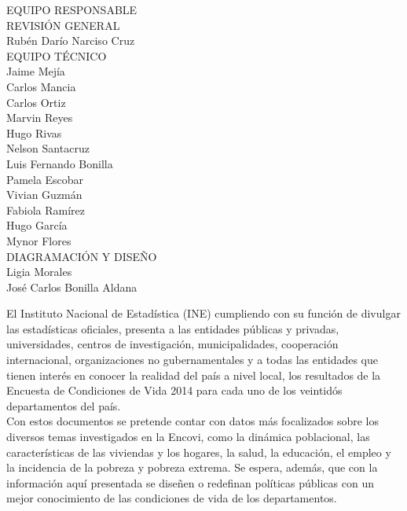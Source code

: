 $\ $
\vspace{1cm}

\begin{center}
	{\Bold \LARGE EQUIPO RESPONSABLE}\\[2cm]
	
	{\Bold \large \color{color1!89!black} REVISIÓN GENERAL}\\[0.2cm]
	Rubén Darío Narciso Cruz\\[0.8cm]
	
	
	{\Bold \large \color{color1!89!black} EQUIPO TÉCNICO}\\[0.2cm]
	Jaime Mejía\\
	Carlos Mancia\\
	Carlos Ortiz\\
	Marvin Reyes\\
	Hugo Rivas\\
	Nelson Santacruz \\
	Luis Fernando Bonilla\\
	Pamela Escobar\\
	Vivian Guzmán\\
	Fabiola Ramírez \\
	Hugo García \\
	Mynor Flores \\[0.8cm]
	
{\Bold \large \color{color1!89!black} DIAGRAMACIÓN Y DISEÑO}\\[0.2cm]
Ligia Morales\\
José Carlos Bonilla Aldana
\end{center}

\cleardoublepage
$\ $\\[2cm]
El Instituto Nacional de Estadística (INE) cumpliendo con su función de divulgar las estadísticas oficiales, presenta a las entidades públicas y privadas, universidades, centros de investigación, municipalidades, cooperación internacional, organizaciones no gubernamentales y a todas las entidades que tienen interés en conocer la realidad del país a nivel local, los resultados de la Encuesta de Condiciones de Vida 2014 para cada uno de los veintidós departamentos del país.\\

Con estos documentos se pretende contar con datos más focalizados sobre los diversos temas investigados en la Encovi, como la dinámica poblacional, las características de las viviendas y los hogares, la salud, la educación, el empleo y la incidencia de la pobreza y pobreza extrema. Se espera, además, que con la información aquí presentada se diseñen o redefinan políticas públicas con un mejor conocimiento de las condiciones de vida de los departamentos.\\

